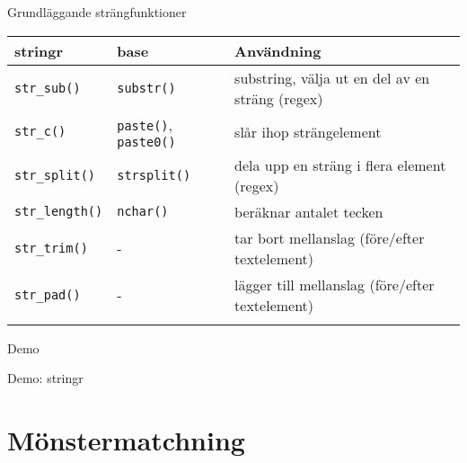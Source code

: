 \documentclass[
  10pt,
  ignorenonframetext,
  handout]{beamer}
\begin{document}
\begin{frame}[fragile]{Grundläggande strängfunktioner}
\label{grundluxe4ggande-struxe4ngfunktioner}
\begin{longtable}[]{@{}
  >{\raggedright\arraybackslash}p{}
  >{\raggedright\arraybackslash}p{}
  >{\raggedright\arraybackslash}p{}@{}}
\toprule\noalign{}
\begin{minipage}[b]{\linewidth}\raggedright
stringr
\end{minipage} & \begin{minipage}[b]{\linewidth}\raggedright
base
\end{minipage} & \begin{minipage}[b]{\linewidth}\raggedright
Användning
\end{minipage} \\
\midrule\noalign{}
\endhead
\texttt{str\_sub()} & \texttt{substr()} & substring, välja ut en del av
en sträng (regex) \\
\texttt{str\_c()} & \texttt{paste()}, \texttt{paste0()} & slår ihop
strängelement \\
\texttt{str\_split()} & \texttt{strsplit()} & dela upp en sträng i flera
element (regex) \\
\texttt{str\_length()} & \texttt{nchar()} & beräknar antalet tecken \\
\texttt{str\_trim()} & - & tar bort mellanslag (före/efter
textelement) \\
\texttt{str\_pad()} & - & lägger till mellanslag (före/efter
textelement) \\
\bottomrule\noalign{}
\end{longtable}
\end{frame}

\begin{frame}{Demo}
\label{demo}
\begin{block}{Demo: stringr}
\label{demo-stringr}
\end{block}
\end{frame}

\section{Mönstermatchning}\label{muxf6nstermatchning}
\end{document}
